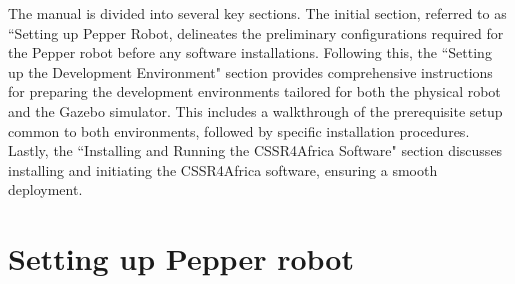 \documentclass{CSSRforAfrica}
\begin{document}
	The manual is divided into several key sections. The initial section, referred to as ``Setting up Pepper Robot, delineates the preliminary configurations required for the Pepper robot before any software installations. Following this, the ``Setting up the Development Environment" section provides comprehensive instructions for preparing the development environments tailored for both the physical robot and the Gazebo simulator. This includes a walkthrough of the prerequisite setup common to both environments, followed by specific installation procedures. Lastly, the ``Installing and Running the CSSR4Africa Software" section discusses installing and initiating the CSSR4Africa software, ensuring a smooth deployment.
	
	\newpage
	
	\section{Setting up Pepper robot}
\end{document}
